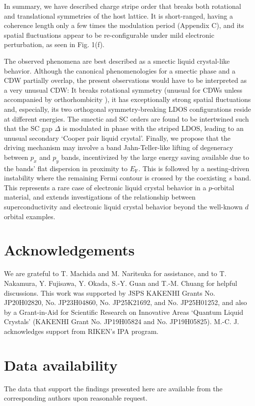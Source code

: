 \documentclass[reprint,superscriptaddress,prb,aps]{revtex4-2}
\begin{document}
In summary, we have described charge stripe order that breaks both rotational and translational symmetries of the host lattice. It is short-ranged, having a coherence length only a few times the modulation period (Appendix C), and its spatial fluctuations appear to be re-configurable under mild electronic perturbation, as seen in Fig. 1(f).

The observed phenomena are best described as a smectic liquid crystal-like behavior. Although the canonical phenomenologies for a smectic phase and a CDW partially overlap, the present observations would have to be interpreted as a very unusual CDW: It breaks rotational symmetry (unusual for CDWs unless accompanied by orthorhombicity \cite{Que2025}), it has exceptionally strong spatial fluctuations and, especially, its two orthogonal symmetry-breaking LDOS configurations reside at different energies.
The smectic and SC orders are found to be intertwined such that the SC gap $\Delta$ is modulated in phase with the striped LDOS, leading to an unusual secondary `Cooper pair liquid crystal'. Finally, we propose that the driving mechanism may involve a band Jahn-Teller-like lifting of degeneracy between $p_{x}$ and $p_{y}$ bands, incentivized by the large energy saving available due to the bands' flat dispersion in proximity to $E_{\mathrm{F}}$. This is followed by a nesting-driven instability where the remaining Fermi contour is crossed by the coexisting $s$ band. This represents a rare case of electronic liquid crystal behavior in a $p$-orbital material, and extends investigations of the relationship between superconductivity and electronic liquid crystal behavior beyond the well-known $d$ orbital examples.


\section*{Acknowledgements}
We are grateful to  T. Machida and M. Naritsuka for assistance, and to T. Nakamura, Y. Fujisawa, Y. Okada, S.-Y. Guan and T.-M. Chuang for helpful discussions. This work was supported by JSPS KAKENHI Grants No. JP20H02820, No. JP23H04860, No. JP25K21692, and No. JP25H01252, and also by a Grant-in-Aid for Scientific Research on Innovative Areas `Quantum Liquid Crystals' (KAKENHI Grant No. JP19H05824 and No. JP19H05825). M.-C. J. acknowledges support from RIKEN's IPA program.


\section*{Data availability}
The data that support the findings presented here are available from the corresponding authors upon reasonable request.
\end{document}
